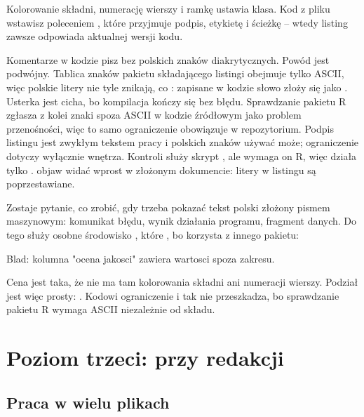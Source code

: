 Kolorowanie składni, numerację wierszy i ramkę ustawia klasa. Kod z pliku wstawisz poleceniem , które przyjmuje podpis, etykietę i ścieżkę -- wtedy listing zawsze odpowiada aktualnej wersji kodu.

 Komentarze w kodzie pisz bez polskich znaków diakrytycznych. Powód jest podwójny. Tablica znaków pakietu składającego listingi obejmuje tylko ASCII, więc polskie litery nie tyle znikają, co : zapisane w kodzie słowo  złoży się jako . Usterka jest cicha, bo kompilacja kończy się bez błędu. Sprawdzanie pakietu R zgłasza z kolei znaki spoza ASCII w kodzie źródłowym jako problem przenośności, więc to samo ograniczenie obowiązuje w repozytorium. Podpis listingu jest zwykłym tekstem pracy i polskich znaków używać może; ograniczenie dotyczy wyłącznie wnętrza. Kontroli służy skrypt , ale wymaga on R, więc działa tylko .  objaw widać wprost w złożonym dokumencie: litery w listingu są poprzestawiane.

Zostaje pytanie, co zrobić, gdy trzeba pokazać tekst polski złożony pismem maszynowym: komunikat błędu, wynik działania programu, fragment danych. Do tego służy osobne środowisko , które , bo korzysta z innego pakietu:

\begin{zapis}
\begin{wydruk}
Blad: kolumna "ocena jakosci" zawiera wartosci spoza zakresu.
\end{wydruk}
\end{zapis}

Cena jest taka, że nie ma tam kolorowania składni ani numeracji wierszy. Podział jest więc prosty: . Kodowi ograniczenie i tak nie przeszkadza, bo sprawdzanie pakietu R wymaga ASCII niezależnie od składu.

\section{Poziom trzeci: przy redakcji}

\subsection{Praca w wielu plikach}

